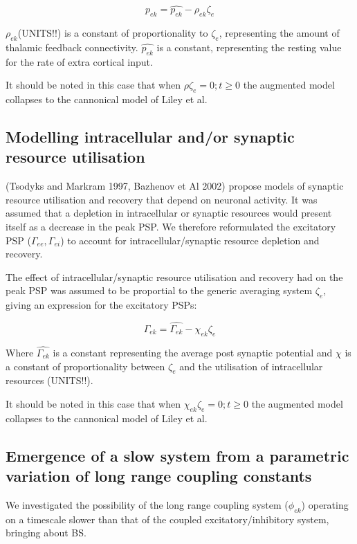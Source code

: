 \documentclass[a4paper,12pt]{article}
\begin{document}
\begin{equation} \label{eq:p_ek}
p_{ek} = \hat{p_{ek}} - \rho_{ek} \zeta_e
\end{equation}

$\rho_{ek}$(UNITS!!) is a constant of proportionality to $\zeta_e$, representing the amount of thalamic feedback connectivity. $\hat{p_{ek}}$ is a constant, representing
the resting value for the rate of extra cortical input. 

It should be noted in this case that when $\rho\zeta_e=0; t \geq 0$ the augmented model collapses to the cannonical model of Liley et al.

\subsection{Modelling intracellular and/or synaptic resource utilisation}
(Tsodyks and Markram 1997, Bazhenov et Al 2002) propose models of synaptic resource utilisation and recovery that depend
on neuronal activity. It was assumed that a depletion in intracellular or synaptic resources would present itself as a decrease in the peak PSP. We therefore reformulated the excitatory PSP ($\Gamma_{ee}, \Gamma_{ei}$) to
account for intracellular/synaptic resource depletion and recovery.

The effect of intracellular/synaptic resource utilisation and recovery had on the peak PSP was assumed to be proportial to the generic averaging system $\zeta_{e}$, giving an expression for
the excitatory PSPs:

\begin{equation} \label{eq:Gamma_ek}
\Gamma_{ek} = \hat{\Gamma_{ek}} - \chi_{ek} \zeta_e
\end{equation}

Where $\hat{\Gamma_{ek}}$ is a constant representing the average post synaptic potential and $\chi$ is a constant of proportionality between $\zeta_e$ and the utilisation of intracellular resources (UNITS!!).

It should be noted in this case that when $\chi_{ek} \zeta_e=0; t \geq 0$ the augmented model collapses to the cannonical model of Liley et al.

\subsection{Emergence of a slow system from a parametric variation of long range coupling constants}
We investigated the possibility of the long range coupling system ($\phi_{ek}$) operating on a timescale slower than that of the coupled excitatory/inhibitory system, bringing about BS. 
\end{document}

